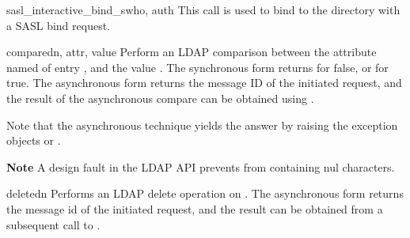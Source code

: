 
\begin{methoddesc}[None]{sasl_interactive_bind_s}{who, auth} %
This call is used to bind to the directory with a SASL bind request.
\end{methoddesc}


\begin{methoddesc}[LDAPObject]{compare}{dn, attr, value} %
Perform an LDAP comparison between the attribute named  of 
entry , and the value . The synchronous form
returns  for false, or  for true.
The asynchronous form returns the message ID of the initiated request, 
and the result of the asynchronous compare can be obtained using 
.  

Note that the asynchronous technique yields the answer
by raising the exception objects  or
.

\textbf{Note} A design fault in the LDAP API prevents  
from containing nul characters.
\end{methoddesc}


\begin{methoddesc}[LDAPObject]{delete}{dn} %
Performs an LDAP delete operation on . The asynchronous form
returns the message id of the initiated request, and the result can be obtained
from a subsequent call to .
\end{methoddesc}


